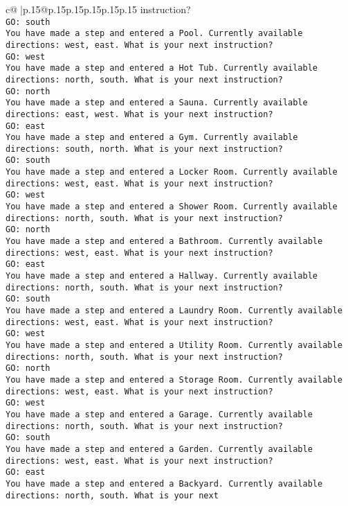 \documentclass{article}
\begin{document}
{\begin{supertabular}{c@{$\;$}|p{.15\linewidth}@{}p{.15\linewidth}p{.15\linewidth}p{.15\linewidth}p{.15\linewidth}p{.15\linewidth}}
{{{instruction?\\ \tt GO: south\\ \tt You have made a step and entered a Pool. Currently available directions: west, east. What is your next instruction?\\ \tt GO: west\\ \tt You have made a step and entered a Hot Tub. Currently available directions: north, south. What is your next instruction?\\ \tt GO: north\\ \tt You have made a step and entered a Sauna. Currently available directions: east, west. What is your next instruction?\\ \tt GO: east\\ \tt You have made a step and entered a Gym. Currently available directions: south, north. What is your next instruction?\\ \tt GO: south\\ \tt You have made a step and entered a Locker Room. Currently available directions: west, east. What is your next instruction?\\ \tt GO: west\\ \tt You have made a step and entered a Shower Room. Currently available directions: north, south. What is your next instruction?\\ \tt GO: north\\ \tt You have made a step and entered a Bathroom. Currently available directions: west, east. What is your next instruction?\\ \tt GO: east\\ \tt You have made a step and entered a Hallway. Currently available directions: north, south. What is your next instruction?\\ \tt GO: south\\ \tt You have made a step and entered a Laundry Room. Currently available directions: west, east. What is your next instruction?\\ \tt GO: west\\ \tt You have made a step and entered a Utility Room. Currently available directions: north, south. What is your next instruction?\\ \tt GO: north\\ \tt You have made a step and entered a Storage Room. Currently available directions: west, east. What is your next instruction?\\ \tt GO: west\\ \tt You have made a step and entered a Garage. Currently available directions: north, south. What is your next instruction?\\ \tt GO: south\\ \tt You have made a step and entered a Garden. Currently available directions: west, east. What is your next instruction?\\ \tt GO: east\\ \tt You have made a step and entered a Backyard. Currently available directions: north, south. What is your next }}}
\end{supertabular}}
\end{document}
